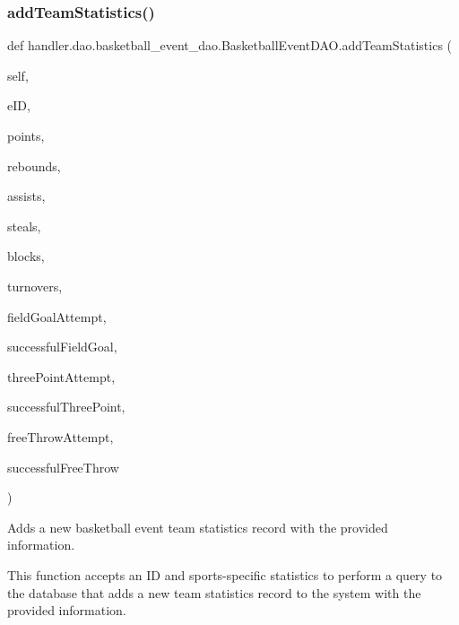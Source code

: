 \subsubsection{\texorpdfstring{add\+Team\+Statistics()}{addTeamStatistics()}}
{\footnotesize\ttfamily def handler.\+dao.\+basketball\+\_\+event\+\_\+dao.\+Basketball\+Event\+D\+A\+O.\+add\+Team\+Statistics (\begin{DoxyParamCaption}\item[{}]{self,  }\item[{}]{e\+ID,  }\item[{}]{points,  }\item[{}]{rebounds,  }\item[{}]{assists,  }\item[{}]{steals,  }\item[{}]{blocks,  }\item[{}]{turnovers,  }\item[{}]{field\+Goal\+Attempt,  }\item[{}]{successful\+Field\+Goal,  }\item[{}]{three\+Point\+Attempt,  }\item[{}]{successful\+Three\+Point,  }\item[{}]{free\+Throw\+Attempt,  }\item[{}]{successful\+Free\+Throw }\end{DoxyParamCaption})}



Adds a new basketball event team statistics record with the provided information. 

This function accepts an ID and sports-\/specific statistics to perform a query to the database that adds a new team statistics record to the system with the provided information.


